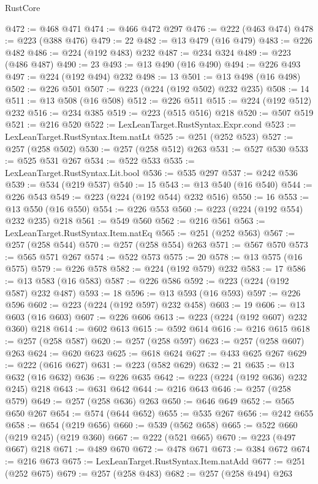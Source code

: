\begin{lexlean}{RustCore}
\begin{coremodule}
@472 := @468 @471
@474 := @466 @472 @297
@476 := @222 (@463 @474)
@478 := @223 (@388 @476)
@479 := 22
@482 := @13 @479 (@16 @479)
@483 := @226 @482
@486 := @224 (@192 @483) @232
@487 := @234 @324
@489 := @223 (@486 @487)
@490 := 23
@493 := @13 @490 (@16 @490)
@494 := @226 @493
@497 := @224 (@192 @494) @232
@498 := 13
@501 := @13 @498 (@16 @498)
@502 := @226 @501
@507 := @223 (@224 (@192 @502) @232 @235)
@508 := 14
@511 := @13 @508 (@16 @508)
@512 := @226 @511
@515 := @224 (@192 @512) @232
@516 := @234 @385
@519 := @223 (@515 @516) @218
@520 := @507 @519
@521 := @216 @520
@522 := LexLeanTarget.RustSyntax.Expr.cond
@523 := LexLeanTarget.RustSyntax.Item.natLt
@525 := @251 (@252 @523)
@527 := @257 (@258 @502)
@530 := @257 (@258 @512) @263
@531 := @527 @530
@533 := @525 @531 @267
@534 := @522 @533
@535 := LexLeanTarget.RustSyntax.Lit.bool
@536 := @535 @297
@537 := @242 @536
@539 := @534 (@219 @537)
@540 := 15
@543 := @13 @540 (@16 @540)
@544 := @226 @543
@549 := @223 (@224 (@192 @544) @232 @516)
@550 := 16
@553 := @13 @550 (@16 @550)
@554 := @226 @553
@560 := @223 (@224 (@192 @554) @232 @235) @218
@561 := @549 @560
@562 := @216 @561
@563 := LexLeanTarget.RustSyntax.Item.natEq
@565 := @251 (@252 @563)
@567 := @257 (@258 @544)
@570 := @257 (@258 @554) @263
@571 := @567 @570
@573 := @565 @571 @267
@574 := @522 @573
@575 := 20
@578 := @13 @575 (@16 @575)
@579 := @226 @578
@582 := @224 (@192 @579) @232
@583 := 17
@586 := @13 @583 (@16 @583)
@587 := @226 @586
@592 := @223 (@224 (@192 @587) @232 @487)
@593 := 18
@596 := @13 @593 (@16 @593)
@597 := @226 @596
@602 := @223 (@224 (@192 @597) @232 @458)
@603 := 19
@606 := @13 @603 (@16 @603)
@607 := @226 @606
@613 := @223 (@224 (@192 @607) @232 @360) @218
@614 := @602 @613
@615 := @592 @614
@616 := @216 @615
@618 := @257 (@258 @587)
@620 := @257 (@258 @597)
@623 := @257 (@258 @607) @263
@624 := @620 @623
@625 := @618 @624
@627 := @433 @625 @267
@629 := @222 (@616 @627)
@631 := @223 (@582 @629)
@632 := 21
@635 := @13 @632 (@16 @632)
@636 := @226 @635
@642 := @223 (@224 (@192 @636) @232 @245) @218
@643 := @631 @642
@644 := @216 @643
@646 := @257 (@258 @579)
@649 := @257 (@258 @636) @263
@650 := @646 @649
@652 := @565 @650 @267
@654 := @574 (@644 @652)
@655 := @535 @267
@656 := @242 @655
@658 := @654 (@219 @656)
@660 := @539 (@562 @658)
@665 := @522 @660 (@219 @245) (@219 @360)
@667 := @222 (@521 @665)
@670 := @223 (@497 @667) @218
@671 := @489 @670
@672 := @478 @671
@673 := @384 @672
@674 := @216 @673
@675 := LexLeanTarget.RustSyntax.Item.natAdd
@677 := @251 (@252 @675)
@679 := @257 (@258 @483)
@682 := @257 (@258 @494) @263

\end{coremodule}
\end{lexlean}
